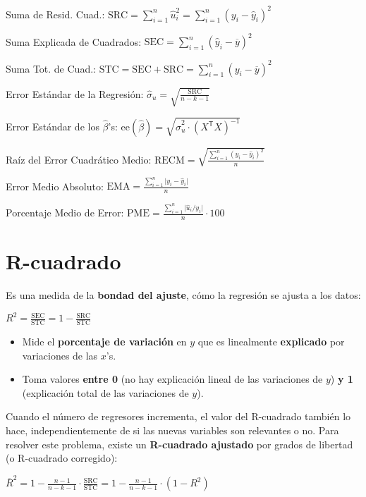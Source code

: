\documentclass[10pt, a4paper, landscape]{extarticle}
\newcommand{\se}{\mathrm{ee}}
\newcommand{\SSR}{\mathrm{SRC}}
\newcommand{\SSE}{\mathrm{SEC}}
\newcommand{\SST}{\mathrm{STC}}
\newcommand{\tr}{\mathsf{T}}
\begin{document}
\begin{multicols}{3}
Suma de Resid. Cuad.: \hfill $\SSR = \sum_{i=1}^n \hat{u}_i^2 = \sum_{i=1}^n (y_i - \hat{y}_i)^2$

Suma Explicada de Cuadrados: \hfill $\SSE = \sum_{i=1}^n (\hat{y}_i - \overline{y})^2$

Suma Tot. de Cuad.: \hfill $\SST = \SSE + \SSR = \sum_{i=1}^n (y_i - \overline{y})^2$

Error Estándar de la Regresión: \hfill $\hat{\sigma}_u = \sqrt{\frac{\SSR}{n - k - 1}}$

Error Estándar de los $\hat{\beta}$'s: \hfill $\se(\hat{\beta}) = \sqrt{\hat{\sigma}^2_u \cdot (X^\tr X)^{-1}}$

Raíz del Error Cuadrático Medio: \hfill $\mathrm{RECM} = \sqrt{\frac{\sum_{i=1}^n (y_i - \hat{y}_i)^2}{n}}$

Error Medio Absoluto: \hfill $\mathrm{EMA} = \frac{\sum_{i=1}^n \lvert y_i - \hat{y}_i \rvert}{n}$

Porcentaje Medio de Error: \hfill $\mathrm{PME} = \frac{\sum_{i=1}^n \lvert \hat{u}_i / y_i \rvert}{n} \cdot 100$

\columnbreak

\section*{R-cuadrado}

Es una medida de la \textbf{bondad del ajuste}, cómo la regresión se ajusta a los datos:

\begin{center}
	$R^2 = \frac{\SSE}{\SST} = 1 - \frac{\SSR}{\SST}$
\end{center}

\begin{itemize}[leftmargin=*]
	\item Mide el \textbf{porcentaje de variación} en $y$ que es linealmente \textbf{explicado} por variaciones de las $x$'s.
	\item Toma valores \textbf{entre 0} (no hay explicación lineal de las variaciones de $y$) \textbf{y 1} (explicación total de las variaciones de $y$).
\end{itemize}

Cuando el número de regresores incrementa, el valor del R-cuadrado también lo hace, independientemente de si las nuevas variables son relevantes o no. Para resolver este problema, existe un \textbf{R-cuadrado ajustado} por grados de libertad (o R-cuadrado corregido):

\begin{center}
	$\overline{R}^2 = 1 - \frac{n - 1}{n - k - 1} \cdot \frac{\SSR}{\SST} = 1 - \frac{n - 1}{n - k - 1} \cdot (1 - R^2)$
\end{center}


\end{multicols}
\end{document}
